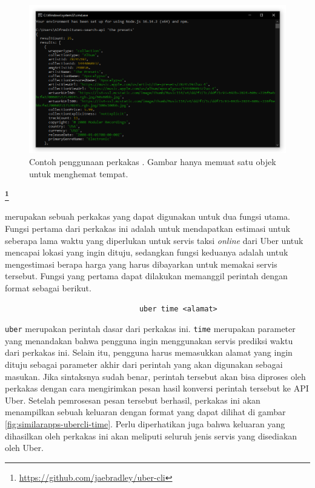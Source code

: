 \documentclass[a4paper,twoside]{article}
\begin{document}
\begin{enumerate}
\begin{figure}[ht]
    \centering
    \includegraphics[width=0.75\linewidth]{itunesapi}
    \caption[Contoh penggunaan perkakas \itunesapi]{Contoh penggunaan perkakas \itunesapi. Gambar hanya memuat satu objek untuk menghemat tempat.}
    \label{fig:similarapps-itunesapi}
\end{figure}

\textbf{\large{\ubercli}\footnote{\href{https://github.com/jaebradley/uber-cli}{https://github.com/jaebradley/uber-cli}}}
\label{sec:similarapps-ubercli}

\ubercli merupakan sebuah perkakas \cl yang dapat digunakan untuk dua fungsi utama. Fungsi pertama dari perkakas ini adalah untuk mendapatkan estimasi untuk seberapa lama waktu yang diperlukan untuk servis taksi \textit{online} dari Uber untuk mencapai lokasi yang ingin dituju, sedangkan fungsi keduanya adalah untuk mengestimasi berapa harga yang harus dibayarkan untuk memakai \mbox{servis} tersebut. 
\newline\newline\noindent
Fungsi yang pertama dapat dilakukan memanggil perintah dengan format sebagai berikut.

\begin{verbatim}
                               uber time <alamat>
\end{verbatim}

\verb|uber| merupakan perintah dasar dari perkakas ini. \verb|time| merupakan parameter yang menandakan bahwa pengguna ingin menggunakan servis prediksi waktu dari perkakas ini. Selain itu, pengguna harus memasukkan alamat yang ingin dituju sebagai parameter akhir dari perintah yang akan digunakan sebagai masukan. Jika sintaksnya sudah benar, perintah tersebut akan bisa diproses oleh perkakas dengan cara mengirimkan pesan hasil konversi perintah tersebut ke API Uber. Setelah pemrosesan pesan tersebut berhasil, perkakas ini akan menampilkan sebuah keluaran dengan format yang dapat dilihat di gambar \ref{fig:similarapps-ubercli-time}. Perlu diperhatikan juga bahwa keluaran yang dihasilkan oleh perkakas ini akan meliputi seluruh jenis servis yang disediakan oleh Uber.


\end{enumerate}
\end{document}
